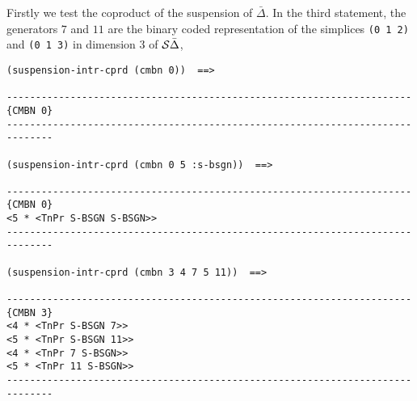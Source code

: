 Firstly we test  the coproduct of the suspension of $\bar\Delta$. In the third
statement, the generators $7$ and $11$ are the binary coded representation 
of the simplices {\tt (0 1 2)} and  {\tt (0 1 3)} in dimension $3$ of 
${\cal S}\bar\Delta$,
{\footnotesize\begin{verbatim}
(suspension-intr-cprd (cmbn 0))  ==>

----------------------------------------------------------------------{CMBN 0}
------------------------------------------------------------------------------

(suspension-intr-cprd (cmbn 0 5 :s-bsgn))  ==>

----------------------------------------------------------------------{CMBN 0}
<5 * <TnPr S-BSGN S-BSGN>>
------------------------------------------------------------------------------

(suspension-intr-cprd (cmbn 3 4 7 5 11))  ==>

----------------------------------------------------------------------{CMBN 3}
<4 * <TnPr S-BSGN 7>>
<5 * <TnPr S-BSGN 11>>
<4 * <TnPr 7 S-BSGN>>
<5 * <TnPr 11 S-BSGN>>
------------------------------------------------------------------------------
\end{verbatim}}

